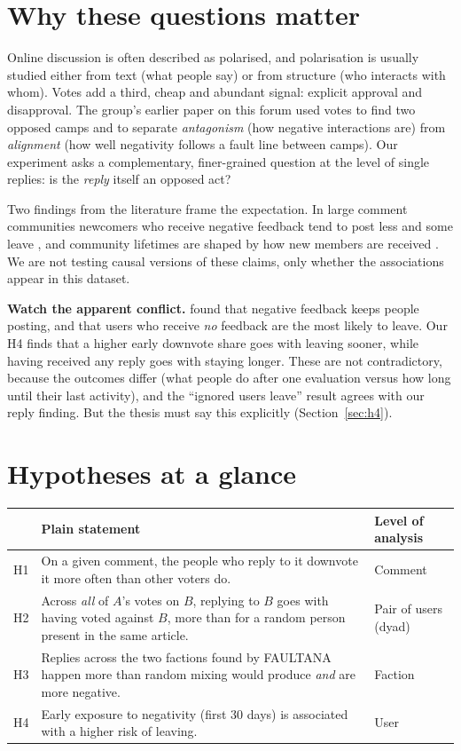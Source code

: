 \section{Why these questions matter}
Online discussion is often described as polarised, and polarisation is usually studied either from text (what people say) or from structure (who interacts with whom). Votes add a third, cheap and abundant signal: explicit approval and disapproval. The group's earlier paper on this forum  used votes to find two opposed camps and to separate \emph{antagonism} (how negative interactions are) from \emph{alignment} (how well negativity follows a fault line between camps). Our experiment asks a complementary, finer-grained question at the level of single replies: is the \emph{reply} itself an opposed act?

Two findings from the literature frame the expectation. In large comment communities newcomers who receive negative feedback tend to post less and some leave , and community lifetimes are shaped by how new members are received . We are not testing causal versions of these claims, only whether the associations appear in this dataset.

\textbf{Watch the apparent conflict.}  found that negative feedback keeps people posting, and that users who receive \emph{no} feedback are the most likely to leave. Our H4 finds that a higher early downvote share goes with leaving sooner, while having received any reply goes with staying longer. These are not contradictory, because the outcomes differ (what people do after one evaluation versus how long until their last activity), and the ``ignored users leave'' result agrees with our reply finding. But the thesis must say this explicitly (Section~\ref{sec:h4}).

\section{Hypotheses at a glance}\label{sec:hyp}
\begin{tabularx}{\textwidth}{@{}l Y Y@{}}
\toprule
 & Plain statement & Level of analysis \\
\midrule
H1 & On a given comment, the people who reply to it downvote it more often than other voters do. & Comment \\
H2 & Across \emph{all} of $A$'s votes on $B$, replying to $B$ goes with having voted against $B$, more than for a random person present in the same article. & Pair of users (dyad) \\
H3 & Replies across the two factions found by FAULTANA happen more than random mixing would produce \emph{and} are more negative. & Faction \\
H4 & Early exposure to negativity (first 30 days) is associated with a higher risk of leaving. & User \\
\bottomrule
\end{tabularx}

